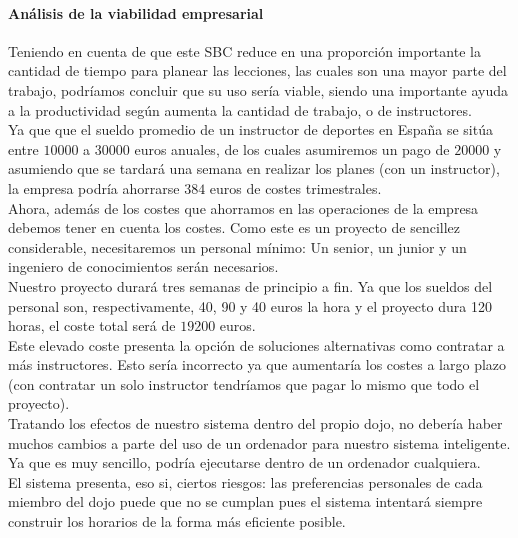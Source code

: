 \documentclass[12pt,a4paper,twoside,spanish]{article}      %
\begin{document}
        \paragraph{Análisis de la viabilidad empresarial}
        Teniendo en cuenta de que este SBC reduce en una proporción importante la cantidad de tiempo para planear las lecciones, las cuales son una
        mayor parte del trabajo, podríamos concluir que su uso sería viable, siendo una importante ayuda a la productividad según
        aumenta la cantidad de trabajo, o de instructores. \\
        Ya que que el sueldo promedio de un instructor de deportes en España se sitúa
        entre $10000$ a $30000$ euros anuales, de los cuales asumiremos un pago de $20000$ y
        asumiendo que se tardará una semana en realizar los planes (con un instructor), la empresa podría ahorrarse $384$ euros de costes trimestrales.
        \\ 
        Ahora, además de los costes que ahorramos en las operaciones de la empresa debemos tener en cuenta los costes. Como este es un proyecto de sencillez
        considerable, necesitaremos un personal mínimo: Un senior, un junior y un ingeniero de conocimientos serán necesarios.
        \\ Nuestro proyecto durará tres semanas de principio a fin.
        Ya que los sueldos del personal son, respectivamente, 40, 90 y 40 euros la hora y el proyecto dura 120 horas, el coste total será de $19200$ euros. \\
        Este elevado coste presenta la opción de soluciones alternativas como contratar a más instructores. Esto sería incorrecto ya que aumentaría los
        costes a largo plazo (con contratar un solo instructor tendríamos que pagar lo mismo que todo el proyecto). \\
        Tratando los efectos de nuestro sistema dentro del propio dojo, no debería haber muchos cambios a parte del uso de un ordenador para nuestro sistema
        inteligente. Ya que es muy sencillo, podría ejecutarse dentro de un ordenador cualquiera. \\ El sistema presenta, eso si, ciertos riesgos:
        las preferencias personales de cada miembro del dojo puede que no se cumplan pues el sistema intentará siempre construir
        los horarios de la forma más eficiente posible. 
\end{document}
